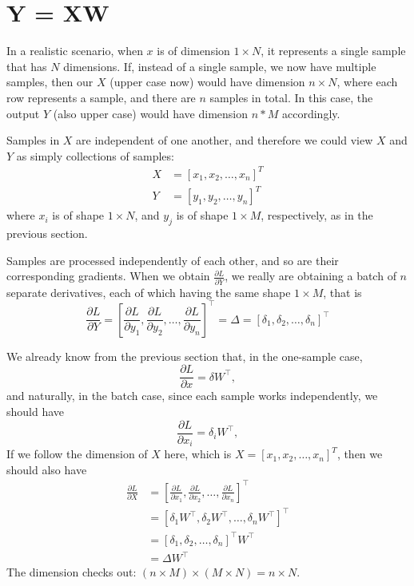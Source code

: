 \documentclass{article}
\begin{document}
\section{Y = XW}
In a realistic scenario, when $x$ is of dimension $1 \times N$, it represents a single sample that has $N$ dimensions. If, instead of a single sample, we now have multiple samples, then our $X$ (upper case now) would have dimension $n \times N$, where each row represents a sample, and there are $n$ samples in total. In this case, the output $Y$ (also upper case) would have dimension $n * M$ accordingly.

Samples in $X$ are independent of one another, and therefore we could view $X$ and $Y$ as simply collections of samples: 
\begin{align}
    X &= [x_1, x_2, \dots, x_n]^T \\
    Y &= [y_1, y_2, \dots, y_n]^T
\end{align}
where $x_i$ is of shape $1 \times N$, and $y_j$ is of shape $1 \times M$, respectively, as in the previous section. 

Samples are processed independently of each other, and so are their corresponding gradients. When we obtain $\frac{\partial L}{\partial Y}$, we really are obtaining a batch of $n$ separate derivatives, each of which having the same shape $1 \times M$, that is 
\begin{equation}
    \frac{\partial L}{\partial Y} = \left[\frac{\partial L}{\partial y_1}, \frac{\partial L}{\partial y_2}, \dots, \frac{\partial L}{\partial y_n}\right]^\top = \Delta = [\delta_1, \delta_2, \dots, \delta_n]^\top
\end{equation}

We already know from the previous section that, in the one-sample case, 
\begin{equation}
    \frac{\partial L}{\partial x} = \delta W^\top,
\end{equation}
and naturally, in the batch case, since each sample works independently, we should have 
\begin{equation}
    \frac{\partial L}{\partial x_i} = \delta_i W^\top,
\end{equation}
If we follow the dimension of $X$ here, which is $X=[x_1, x_2, \dots, x_n]^T$, then we should also have 
\begin{align}
    \frac{\partial L}{\partial X} &= \left[\frac{\partial L}{\partial x_1}, \frac{\partial L}{\partial x_2}, \dots, \frac{\partial L}{\partial x_n}\right]^\top \\ 
    &= [\delta_1 W^\top, \delta_2 W^\top, \dots, \delta_n W^\top]^\top \\
    &= [\delta_1, \delta_2, \dots, \delta_n]^\top W^\top \\
    &= \Delta W^\top
\end{align}
The dimension checks out: $(n \times M) \times (M \times N) = n \times N$.
\end{document}
